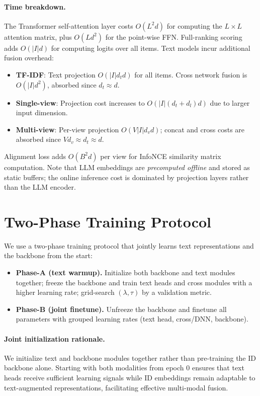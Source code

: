\documentclass[sigconf,natbib=true]{acmart}
\newcommand{\tfidf}{\textsc{TF-IDF}\xspace}
\newcommand{\llm}{\textsc{LLM}\xspace}
\begin{document}
\paragraph{Time breakdown.}
The Transformer self-attention layer costs $O(L^2d)$ for
computing the $L\times L$ attention matrix, plus $O(Ld^2)$
for the point-wise FFN. Full-ranking scoring adds $O(|I|d)$
for computing logits over all items. Text models incur
additional fusion overhead:
\begin{itemize}[leftmargin=*,itemsep=1pt]
  \item \textbf{\tfidf}: Text projection $O(|I| d_t d)$ for all items.
    Cross network fusion is $O(|I| d^2)$, absorbed since $d_t \approx d$.
  \item \textbf{Single-view}: Projection cost increases to
    $O(|I| (d_t + d_l) d)$ due to larger input dimension.
  \item \textbf{Multi-view}: Per-view projection $O(V |I| d_v d)$;
    concat and cross costs are absorbed since $V d_v \approx d_t \approx d$.
\end{itemize}
Alignment loss adds $O(B^2 d)$ per view for InfoNCE similarity
matrix computation. Note that \llm embeddings are
\emph{precomputed offline} and stored as static buffers; the
online inference cost is dominated by projection layers
rather than the \llm encoder.

\section{Two-Phase Training Protocol}
We use a two-phase training protocol that jointly learns text
representations and the backbone from the start:
\begin{itemize}[leftmargin=*,itemsep=2pt]
  \item \textbf{Phase-A (text warmup).}
    Initialize both backbone and text modules together;
    freeze the backbone and train text heads and cross modules
    with a higher learning rate;
    grid-search $(\lambda,\tau)$ by a validation metric.
  \item \textbf{Phase-B (joint finetune).}
    Unfreeze the backbone and finetune all parameters
    with grouped learning rates (text head, cross/DNN, backbone).
\end{itemize}
\paragraph{Joint initialization rationale.}
We initialize text and backbone modules together rather than
pre-training the ID backbone alone. Starting with both modalities
from epoch 0 ensures that text heads receive sufficient learning
signals while ID embeddings remain adaptable to text-augmented
representations, facilitating effective multi-modal fusion.
\end{document}
